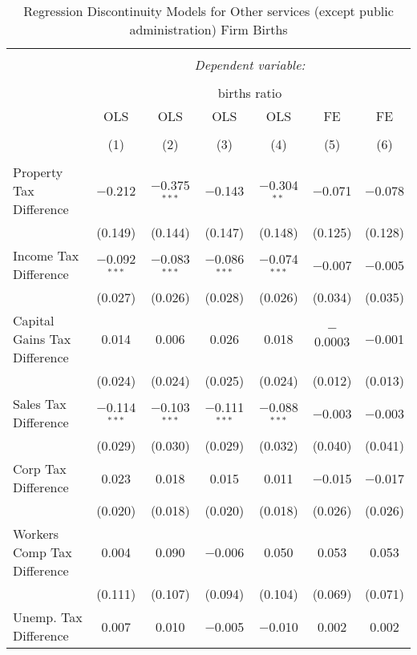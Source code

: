 
\begin{table}[!htbp] \centering 
  \caption{Regression Discontinuity Models for  Other services (except public administration) Firm Births} 
  \label{81rd} 
\begin{tabular}{@{\extracolsep{5pt}}lcccccc} 
\\[-1.8ex]\hline 
\hline \\[-1.8ex] 
 & \multicolumn{6}{c}{\textit{Dependent variable:}} \\ 
\cline{2-7} 
\\[-1.8ex] & \multicolumn{6}{c}{births ratio} \\ 
 & OLS & OLS & OLS & OLS & FE & FE \\ 
\\[-1.8ex] & (1) & (2) & (3) & (4) & (5) & (6)\\ 
\hline \\[-1.8ex] 
 Property Tax Difference & $-$0.212 & $-$0.375$^{***}$ & $-$0.143 & $-$0.304$^{**}$ & $-$0.071 & $-$0.078 \\ 
  & (0.149) & (0.144) & (0.147) & (0.148) & (0.125) & (0.128) \\ 
  Income Tax Difference & $-$0.092$^{***}$ & $-$0.083$^{***}$ & $-$0.086$^{***}$ & $-$0.074$^{***}$ & $-$0.007 & $-$0.005 \\ 
  & (0.027) & (0.026) & (0.028) & (0.026) & (0.034) & (0.035) \\ 
  Capital Gains Tax Difference & 0.014 & 0.006 & 0.026 & 0.018 & $-$0.0003 & $-$0.001 \\ 
  & (0.024) & (0.024) & (0.025) & (0.024) & (0.012) & (0.013) \\ 
  Sales Tax Difference & $-$0.114$^{***}$ & $-$0.103$^{***}$ & $-$0.111$^{***}$ & $-$0.088$^{***}$ & $-$0.003 & $-$0.003 \\ 
  & (0.029) & (0.030) & (0.029) & (0.032) & (0.040) & (0.041) \\ 
  Corp Tax Difference & 0.023 & 0.018 & 0.015 & 0.011 & $-$0.015 & $-$0.017 \\ 
  & (0.020) & (0.018) & (0.020) & (0.018) & (0.026) & (0.026) \\ 
  Workers Comp Tax Difference & 0.004 & 0.090 & $-$0.006 & 0.050 & 0.053 & 0.053 \\ 
  & (0.111) & (0.107) & (0.094) & (0.104) & (0.069) & (0.071) \\ 
  Unemp. Tax Difference & 0.007 & 0.010 & $-$0.005 & $-$0.010 & 0.002 & 0.002 \\ 

\end{tabular}
\end{table}
